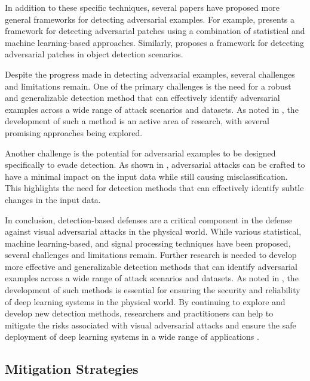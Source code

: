 \documentclass[11pt,a4paper]{article}
\begin{document}
In addition to these specific techniques, several papers have proposed more general frameworks for detecting adversarial examples. For example, \cite{arxiv:2005.10884} presents a framework for detecting adversarial patches using a combination of statistical and machine learning-based approaches. Similarly, \cite{doi:10.1109/cvpr52688.2022.01455} proposes a framework for detecting adversarial patches in object detection scenarios.

Despite the progress made in detecting adversarial examples, several challenges and limitations remain. One of the primary challenges is the need for a robust and generalizable detection method that can effectively identify adversarial examples across a wide range of attack scenarios and datasets. As noted in \cite{doi:10.1109/access.2022.3216291}, the development of such a method is an active area of research, with several promising approaches being explored.

Another challenge is the potential for adversarial examples to be designed specifically to evade detection. As shown in \cite{doi:10.1007/s11633-019-1211-x}, adversarial attacks can be crafted to have a minimal impact on the input data while still causing misclassification. This highlights the need for detection methods that can effectively identify subtle changes in the input data.

In conclusion, detection-based defenses are a critical component in the defense against visual adversarial attacks in the physical world. While various statistical, machine learning-based, and signal processing techniques have been proposed, several challenges and limitations remain. Further research is needed to develop more effective and generalizable detection methods that can identify adversarial examples across a wide range of attack scenarios and datasets. As noted in \cite{doi:10.1109/access.2024.3435347}, the development of such methods is essential for ensuring the security and reliability of deep learning systems in the physical world. By continuing to explore and develop new detection methods, researchers and practitioners can help to mitigate the risks associated with visual adversarial attacks and ensure the safe deployment of deep learning systems in a wide range of applications \cite{doi:10.1016/j.eswa.2025.128967}.


\subsection{Mitigation Strategies}
\end{document}
